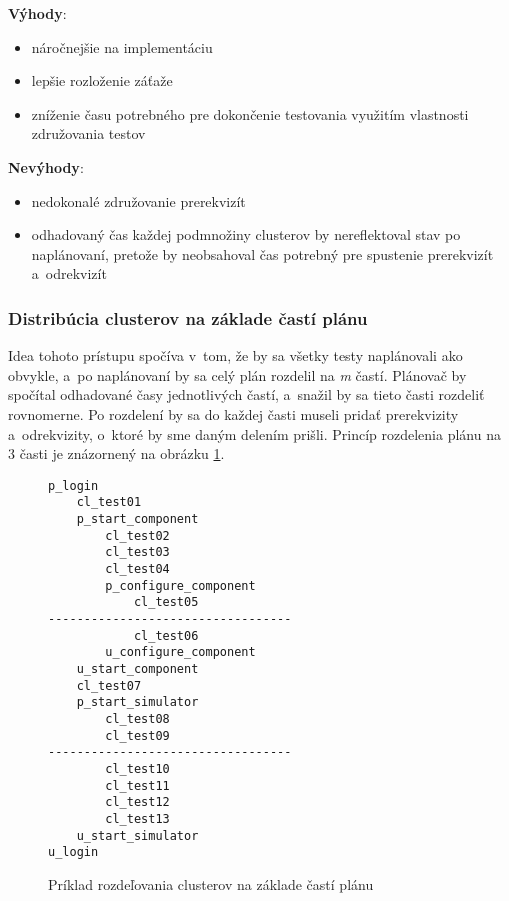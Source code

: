 \noindent \textbf{Výhody}:
\begin{itemize}
\item náročnejšie na implementáciu
\item lepšie rozloženie záťaže
\item zníženie času potrebného pre dokončenie testovania využitím vlastnosti združovania testov
\end{itemize} 

\noindent \textbf{Nevýhody}:
\begin{itemize}
\item nedokonalé združovanie prerekvizít 
\item odhadovaný čas každej podmnožiny clusterov by nereflektoval stav po naplánovaní, pretože by
neobsahoval čas potrebný pre spustenie prerekvizít a~odrekvizít
\end{itemize}

\subsubsection*{Distribúcia clusterov na základe častí plánu}
Idea tohoto prístupu spočíva v~tom, že by sa všetky testy naplánovali ako obvykle, a~po naplánovaní by sa
celý plán rozdelil na \emph{m} častí. Plánovač by spočítal odhadované časy jednotlivých častí, a~snažil by sa tieto časti
rozdeliť rovnomerne. Po rozdelení by sa do každej časti museli pridať prerekvizity a~odrekvizity, o~ktoré
by sme daným delením prišli. Princíp rozdelenia plánu na 3 časti je znázornený na obrázku \ref{fig:distribucia_casti}.
\begin{figure}[h]
\begin{lstlisting}
p_login
    cl_test01
    p_start_component
        cl_test02
        cl_test03
        cl_test04
        p_configure_component
            cl_test05
----------------------------------
            cl_test06
        u_configure_component
    u_start_component
    cl_test07
    p_start_simulator
        cl_test08
        cl_test09
----------------------------------
        cl_test10
        cl_test11
        cl_test12
        cl_test13
    u_start_simulator
u_login
\end{lstlisting}
\caption{Príklad rozdeľovania clusterov na základe častí plánu}
\label{fig:distribucia_casti}
\end{figure}

